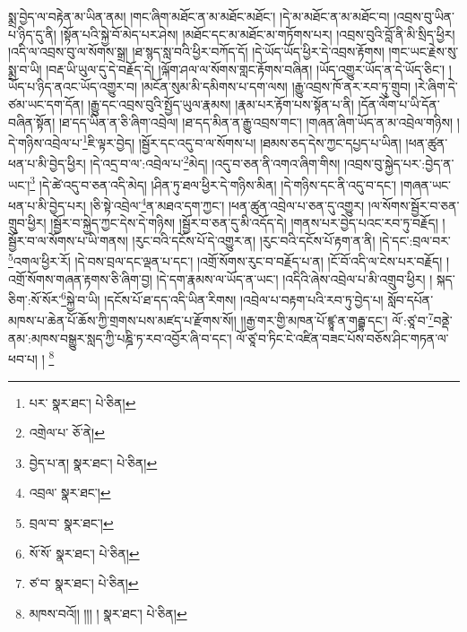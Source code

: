 སྨྲ་བྱེད་ལ་བརྟེན་མ་ཡིན་ནམ། །གང་ཞིག་མཐོང་ན་མ་མཐོང་མཐོང་། །དེ་མ་མཐོང་ན་མ་མཐོང་བ། །འབྲས་བུ་ཡིན་པ་ཉིད་དུ་ནི། །སྟོན་པའི་སྐྱེ་བོ་མེད་པར་ཤེས། །མཐོང་དང་མ་མཐོང་མ་གཏོགས་པར། །འབྲས་བུའི་བློ་ནི་མི་སྲིད་ཕྱིར། །འདི་ལ་འབྲས་བུ་ལ་སོགས་སྒྲ། །ཐ་སྙད་སླ་བའི་ཕྱིར་བཀོད་དོ། །དེ་ཡོད་ཡོད་ཕྱིར་དེ་འབྲས་རྟོགས། །གང་ཡང་རྗེས་སུ་སྨྲ་བ་ཡི། །བརྡ་ཡི་ཡུལ་དུ་དེ་བརྗོད་དེ། །ལྐོག་ཤལ་ལ་སོགས་གླང་རྟོགས་བཞིན། །ཡོད་འགྱུར་ཡོད་ན་དེ་ཡོད་ཅིང་། །ཡོད་པ་ཉིད་ནའང་ཡོད་འགྱུར་བ། །མངོན་སུམ་མི་དམིགས་པ་དག་ལས། །རྒྱུ་འབྲས་ཁོ་ནར་རབ་ཏུ་གྲུབ། །རེ་ཞིག་དེ་ཙམ་ཡང་དག་དོན། །རྒྱུ་དང་འབྲས་བུའི་སྤྱོད་ཡུལ་རྣམས། །རྣམ་པར་རྟོག་པས་སྟོན་པ་ནི། །དོན་ལོག་པ་ཡི་དོན་བཞིན་སྟོན། །ཐ་དད་ཡིན་ན་ཅི་ཞིག་འབྲེལ། །ཐ་དད་མིན་ན་རྒྱུ་འབྲས་གང་། །གཞན་ཞིག་ཡོད་ན་མ་འབྲེལ་གཉིས། །དེ་གཉིས་འབྲེལ་པ་\footnote{པར་  སྣར་ཐང་།  པེ་ཅིན། }ཇི་ལྟར་བྱེད། །སྦྱོར་དང་འདུ་བ་ལ་སོགས་པ། །ཐམས་ཅད་དེས་ཀྱང་དཔྱད་པ་ཡིན། །ཕན་ཚུན་ཕན་པ་མི་བྱེད་ཕྱིར། །དེ་འདྲ་བ་ལ་:འབྲེལ་པ་\footnote{འགྲེལ་པ་  ཅོ་ནེ། }མེད། །འདུ་བ་ཅན་ནི་འགའ་ཞིག་གིས། །འབྲས་བུ་སྐྱེད་པར་:བྱེད་ན་ཡང་།\footnote{བྱེད་པ་ན།  སྣར་ཐང་།  པེ་ཅིན། } །དེ་ཚེ་འདུ་བ་ཅན་འདི་མེད། །ཤིན་ཏུ་ཐལ་ཕྱིར་དེ་གཉིས་མིན། །དེ་གཉིས་དང་ནི་འདུ་བ་དང་། །གཞན་ཡང་ཕན་པ་མི་བྱེད་པར། །ཅི་སྟེ་འབྲེལ་\footnote{འབྲལ་  སྣར་ཐང་། }ན་མཐའ་དག་ཀྱང་། །ཕན་ཚུན་འབྲེལ་པ་ཅན་དུ་འགྱུར། །ལ་སོགས་སྦྱོར་བ་ཅན་གྲུབ་ཕྱིར། །སྦྱོར་བ་སྐྱེད་ཀྱང་དེས་དེ་གཉིས། །སྦྱོར་བ་ཅན་དུ་མི་འདོད་དེ། །གནས་པར་བྱེད་པའང་རབ་ཏུ་བརྗོད། །སྦྱོར་བ་ལ་སོགས་པ་ཡི་གནས། །རུང་བའི་དངོས་པོ་དེ་འགྱུར་ན། །རུང་བའི་དངོས་པོ་རྟག་ན་ནི། །དེ་དང་:བྲལ་བར་\footnote{བྲལ་བ་  སྣར་ཐང་། }འགལ་ཕྱིར་རོ། །དེ་བས་བྲལ་དང་ལྡན་པ་དང་། །འགྲོ་སོགས་རུང་བ་བརྗོད་པ་ན། །ངོ་བོ་འདི་ལ་ངེས་པར་བརྗོད། །འགྲོ་སོགས་གཞན་རྟགས་ཅི་ཞིག་བྱ། །དེ་དག་རྣམས་ལ་ཡོད་ན་ཡང་། །འདིའི་ཞེས་འབྲེལ་པ་མི་འགྲུབ་ཕྱིར། །
སྐད་ཅིག་:སོ་སོར་\footnote{སོ་སོ་  སྣར་ཐང་།  པེ་ཅིན། }སྐྱེ་བ་ཡི། །དངོས་པོ་ཐ་དད་འདི་ཡིན་རིགས། །འབྲེལ་པ་བརྟག་པའི་རབ་ཏུ་བྱེད་པ། སློབ་དཔོན་མཁས་པ་ཆེན་པོ་ཆོས་ཀྱི་གྲགས་པས་མཛད་པ་རྫོགས་སོ།། །།རྒྱ་གར་གྱི་མཁན་པོ་ཛྙཱ་ན་གརྦྷ་དང་། ལོ་:ཙཱ་བ་\footnote{ཙ་བ་  སྣར་ཐང་།  པེ་ཅིན། }བནྡེ་ནམ་:མཁས་བསྒྱུར་སླད་ཀྱི་པཎྜི་ཏ་རབ་འབྱོར་ཞི་བ་དང་། ལོ་ཙཱ་བ་ཏིང་ངེ་འཛིན་བཟང་པོས་བཅོས་ཤིང་གཏན་ལ་ཕབ་པ། ། \footnote{མཁས་བའོ།། །།། །   སྣར་ཐང་།  པེ་ཅིན། }